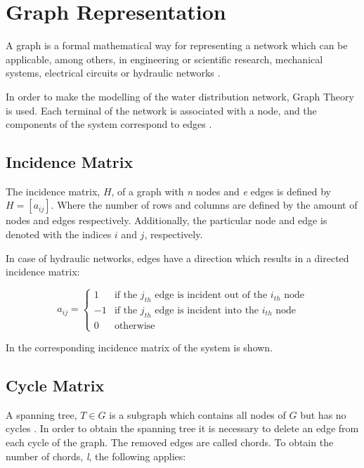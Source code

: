 \section{Graph Representation}  
\label{GraphTheory}
A graph is a formal mathematical way for representing a network which can be applicable, among others, 
in engineering or scientific research, mechanical systems, electrical circuits or hydraulic networks \cite{graph_intro}. 

In order to make the modelling of the water distribution network, Graph Theory is used. 
Each terminal of the network is associated with a node, and the components of the system correspond to edges \cite{GraphTheoryCarsten}. 
\subsection{Incidence Matrix} 

The incidence matrix, $H$, of a graph with \textit{n} nodes and \textit{e} edges is 
defined by $H = [a_{ij}]$. Where the number of rows and columns are defined by the amount of nodes and edges respectively. 
Additionally, the particular node and edge is denoted with the indices $i$ and 
$j$, respectively.

In case of hydraulic networks, edges have a direction which results in a directed incidence matrix:

\begin{equation}
\label{DiGraph}
 a_{ij} =
		\left\{
		\begin{array}{ll}
		
		1 			&      \text{if the $j_{th}$ edge is incident out of the $i_{th}$ node}	
\\
		-1                       &     \text{if the $j_{th}$ edge is incident into the $i_{th}$ node}
\\


                0                       &      \text{otherwise}

		\end{array}
		\right.
\end{equation}	

In  the corresponding incidence matrix of the system is 
shown. 

\subsection{Cycle Matrix}
\label{CycleSection}
A spanning tree, $T \in G$ is a subgraph which contains all nodes of $G$ but has no cycles \cite{GraphModel}. 
In order to obtain the spanning tree it is necessary to delete an edge from each cycle of the graph. The removed edges are called chords. To obtain the number 
of chords, \textit{l}, the following applies:

